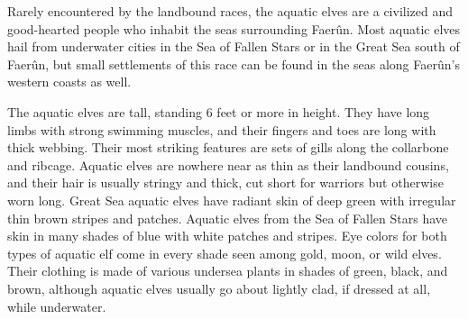 
Rarely encountered by the landbound races, the aquatic elves are a civilized and good-hearted people who inhabit the seas surrounding Faerûn. Most aquatic elves hail from underwater cities in the Sea of Fallen Stars or in the Great Sea south of Faerûn, but small settlements of this race can be found in the seas along Faerûn’s western coasts as well.

The aquatic elves are tall, standing 6 feet or more in height. They have long limbs with strong swimming muscles, and their fingers and toes are long with thick webbing. Their most striking features are sets of gills along the collarbone and ribcage. Aquatic elves are nowhere near as thin as their landbound cousins, and their hair is usually stringy and thick, cut short for warriors but otherwise worn long. Great Sea aquatic elves have radiant skin of deep green with irregular thin brown stripes and patches. Aquatic elves from the Sea of Fallen Stars have skin in many shades of blue with white patches and stripes. Eye colors for both types of aquatic elf come in every shade seen among gold, moon, or wild elves. Their clothing is made of various undersea plants in shades of green, black, and brown, although aquatic elves usually go about lightly clad, if dressed at all, while underwater.

